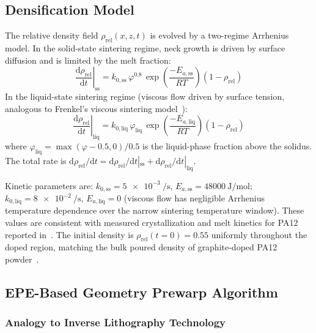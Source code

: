 \documentclass[5p,times]{elsarticle}
\newcommand{\rhorel}{\rho_{\mathrm{rel}}}
\newcommand{\phimelt}{\varphi}
\begin{document}
\subsection{Densification Model}
\label{sec:densification_model}

The relative density field $\rhorel(x,z,t)$ is evolved by a
two-regime Arrhenius model.  In the solid-state sintering regime, neck
growth is driven by surface diffusion and is limited by the melt
fraction:
\begin{equation}
  \left.\frac{\mathrm{d}\rhorel}{\mathrm{d}t}\right|_{\mathrm{ss}}
  = k_{0,\mathrm{ss}}\,\phimelt^{0.8}\,
    \exp\!\left(\frac{-E_{a,\mathrm{ss}}}{RT}\right)(1 - \rhorel)
  \label{eq:densification_ss}
\end{equation}
In the liquid-state sintering regime (viscous flow driven by surface
tension, analogous to Frenkel's viscous sintering
model~\cite{Frenkel1945,Zarringhalam2009}):
\begin{equation}
  \left.\frac{\mathrm{d}\rhorel}{\mathrm{d}t}\right|_{\mathrm{liq}}
  = k_{0,\mathrm{liq}}\,\phimelt_{\mathrm{liq}}\,
    \exp\!\left(\frac{-E_{a,\mathrm{liq}}}{RT}\right)(1 - \rhorel)
  \label{eq:densification_liq}
\end{equation}
where $\phimelt_{\mathrm{liq}} = \max(\phimelt - 0.5, 0)/0.5$ is the
liquid-phase fraction above the solidus.  The total rate is
$\mathrm{d}\rhorel/\mathrm{d}t = \mathrm{d}\rhorel/\mathrm{d}t|_{\mathrm{ss}}
+ \mathrm{d}\rhorel/\mathrm{d}t|_{\mathrm{liq}}$.

Kinetic parameters are:
$k_{0,\mathrm{ss}} = \SI{5e-3}{\per\second}$,
$E_{a,\mathrm{ss}} = \SI{48000}{\joule\per\mol}$;
$k_{0,\mathrm{liq}} = \SI{8e-2}{\per\second}$,
$E_{a,\mathrm{liq}} = 0$ (viscous flow has negligible Arrhenius
temperature dependence over the narrow sintering temperature window).
These values are consistent with measured crystallization and melt
kinetics for PA12 reported in~\cite{zhao2018crystallization,peyre2015sls,Zarringhalam2009}.  The initial density is $\rhorel(t=0) = 0.55$
uniformly throughout the doped region, matching the bulk poured density
of graphite-doped PA12 powder~\cite{verbelen2016characterization}.

\subsection{EPE-Based Geometry Prewarp Algorithm}
\label{sec:prewarp_algorithm}

\subsubsection{Analogy to Inverse Lithography Technology}
\end{document}
